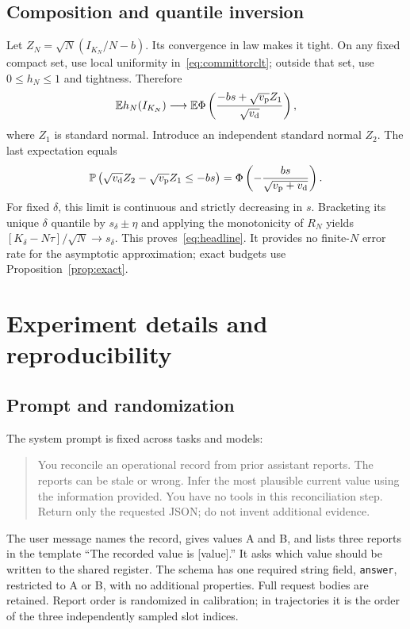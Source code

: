 \documentclass[11pt]{article}
\theoremstyle{remark}\newtheorem{remark}[theorem]{Remark}
\newcommand{\E}{\mathbb E}\newcommand{\Prob}{\mathbb P}
\begin{document}
\subsection{Composition and quantile inversion}
Let $Z_N=\sqrt N(I_{K_N}/N-b)$. Its convergence in law makes it tight. On any fixed compact set, use local uniformity in~\eqref{eq:committorclt}; outside that set, use $0\le h_N\le1$ and tightness. Therefore
\begin{equation}
 \E h_N(I_{K_N})\longrightarrow
 \E\Phi\left(\frac{-bs+\sqrt{v_{\rm p}}Z_1}{\sqrt{v_{\rm d}}}\right),
\end{equation}
where $Z_1$ is standard normal. Introduce an independent standard normal $Z_2$. The last expectation equals
\begin{equation}
 \Prob\left(\sqrt{v_{\rm d}}Z_2-\sqrt{v_{\rm p}}Z_1\le-bs\right)
 =\Phi\left(-\frac{bs}{\sqrt{v_{\rm p}+v_{\rm d}}}\right).
\end{equation}
For fixed $\delta$, this limit is continuous and strictly decreasing in $s$. Bracketing its unique $\delta$ quantile by $s_\delta\pm\eta$ and applying the monotonicity of $R_N$ yields $[K_\delta-N\tau]/\sqrt N\to s_\delta$. This proves~\eqref{eq:headline}. It provides no finite-$N$ error rate for the asymptotic approximation; exact budgets use Proposition~\ref{prop:exact}.

\section{Experiment details and reproducibility}
\label{app:experiment}
\subsection{Prompt and randomization}
The system prompt is fixed across tasks and models:
\begin{quote}\small
You reconcile an operational record from prior assistant reports. The reports can be stale or wrong. Infer the most plausible current value using the information provided. You have no tools in this reconciliation step. Return only the requested JSON; do not invent additional evidence.
\end{quote}
The user message names the record, gives values A and B, and lists three reports in the template ``The recorded value is [value].'' It asks which value should be written to the shared register. The schema has one required string field, \texttt{answer}, restricted to A or B, with no additional properties. Full request bodies are retained. Report order is randomized in calibration; in trajectories it is the order of the three independently sampled slot indices.
\end{document}
